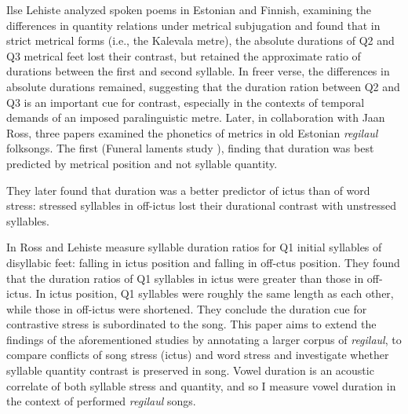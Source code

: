 Ilse Lehiste analyzed spoken poems in Estonian and Finnish, examining the differences in quantity relations under metrical subjugation and found that in strict metrical forms (i.e., the Kalevala metre), the absolute durations of Q2 and Q3 metrical feet lost their contrast, but retained the approximate ratio of durations between the first and second syllable. In freer verse, the differences in absolute durations remained, suggesting that the duration ration between Q2 and Q3 is an important cue for contrast, especially in the contexts of temporal demands of an imposed paralinguistic metre. 
\citep{lehistePhoneticsMetrics1992} Later, in collaboration with Jaan Ross, three papers examined the phonetics of metrics in old Estonian {\it regilaul} folksongs. The first (Funeral laments study )\citep{rossLostProsodicOppositions1994}, finding that duration was best predicted by metrical position and not syllable quantity. 




They later found that duration was a better predictor of ictus  than of word stress: stressed syllables in off-ictus lost their durational contrast with unstressed syllables.  \citep{rossTradeoffQuantityStress1996} 

In \citep{rossTimingEstonianFolk1998} Ross and Lehiste measure syllable duration ratios for Q1 initial syllables of disyllabic feet: falling in ictus position and falling in off-ctus position. They found that the duration ratios of Q1 syllables in ictus were greater than those in off-ictus. In ictus position, Q1 syllables were roughly the same length as each other, while those in off-ictus were shortened. They conclude the duration cue for contrastive stress is subordinated to the song. 
This paper aims to extend the findings of the aforementioned studies \citep{lehistePhoneticsMetrics1992, rossLostProsodicOppositions1994,rossTradeoffQuantityStress1996,rossTimingEstonianFolk1998} by annotating a larger corpus of {\it regilaul}, to compare conflicts of song stress (ictus) and word stress 
and investigate whether syllable quantity contrast is preserved in song. Vowel duration is an acoustic correlate of both syllable stress and quantity, and so I measure vowel duration in the context of performed {\it regilaul} songs. 
%

